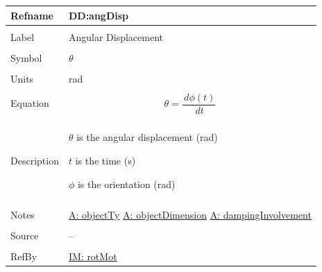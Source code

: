 \documentclass[12pt]{article}
\begin{document}
\noindent \begin{minipage}{\textwidth}
          \begin{tabular}{>{\raggedright}p{}>{\raggedright\arraybackslash}p{}}
          \toprule \textbf{Refname} & \textbf{DD:angDisp}
          \label{DD:angDisp}
          \\ \midrule \\
          Label & Angular Displacement
          \\ \midrule \\
          Symbol & $θ$
          \\ \midrule \\
          Units & rad
          \\ \midrule \\
          Equation & \begin{displaymath}
                     θ=\frac{\,dϕ\left(t\right)}{\,dt}
                     \end{displaymath}
          \\ \midrule \\
          Description & \begin{symbDescription}
                        \item{$θ$ is the angular displacement (rad)}
                        \item{$t$ is the time (s)}
                        \item{$ϕ$ is the orientation (rad)}
                        \end{symbDescription}
          \\ \midrule \\
          Notes & \hyperref[assumpOT]{A: objectTy}
                  \hyperref[assumpOD]{A: objectDimension}
                  \hyperref[assumpDI]{A: dampingInvolvement}
          \\ \midrule \\
          Source & --
          \\ \midrule \\
          RefBy & \hyperref[IM:rotMot]{IM: rotMot}
          \\ \bottomrule
          \end{tabular}
          \end{minipage}
\par~
\end{document}
